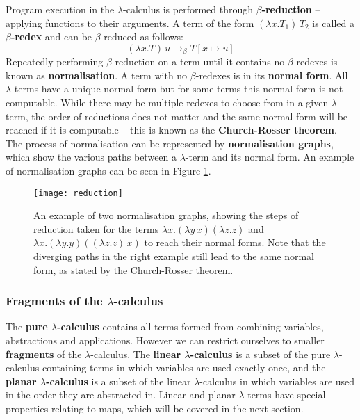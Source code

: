 \documentclass[12pt]{article}
\begin{document}
Program execution in the $\lambda$-calculus is performed through \textbf{$\beta$-reduction} -- applying functions to their arguments. A term of the form $(\lambda x. T_1) \, T_2$ is called a \textbf{$\beta$-redex} and can be $\beta$-reduced as follows:
%
$$(\lambda x. T) \, u \to_\beta T[x \mapsto u]$$
%
Repeatedly performing $\beta$-reduction on a term until it contains no $\beta$-redexes is known as \textbf{normalisation}. A term with no $\beta$-redexes is in its \textbf{normal form}. All $\lambda$-terms have a unique normal form but for some terms this normal form is not computable. While there may be multiple redexes to choose from in a given $\lambda$-term, the order of reductions does not matter and the same normal form will be reached if it is computable -- this is known as the \textbf{Church-Rosser theorem}. The process of normalisation can be represented by \textbf{normalisation graphs}, which show the various paths between a $\lambda$-term and its normal form. An example of normalisation graphs can be seen in Figure \ref{fig:normgraphs}.

\begin{figure}
    \centering
    \texttt{[image: reduction]}
    \caption{An example of two normalisation graphs, showing the steps of reduction taken for the terms $\lambda x. (\lambda y \, x) (\lambda z. z)$ and $\lambda x. (\lambda y. y) ((\lambda z. z) \, x)$ to reach their normal forms. Note that the diverging paths in the right example still lead to the same normal form, as stated by the Church-Rosser theorem.}
    \label{fig:normgraphs}
\end{figure}

\subsubsection{Fragments of the \texorpdfstring{$\lambda$}{lambda}-calculus}
The \textbf{pure $\lambda$-calculus} contains all terms formed from combining variables, abstractions and applications. However we can restrict ourselves to smaller \textbf{fragments} of the $\lambda$-calculus. The \textbf{linear $\lambda$-calculus} is a subset of the pure $\lambda$-calculus containing terms in which variables are used exactly once, and the \textbf{planar $\lambda$-calculus} is a subset of the linear $\lambda$-calculus in which variables are used in the order they are abstracted in. Linear and planar $\lambda$-terms have special properties relating to maps, which will be covered in the next section.
\end{document}
